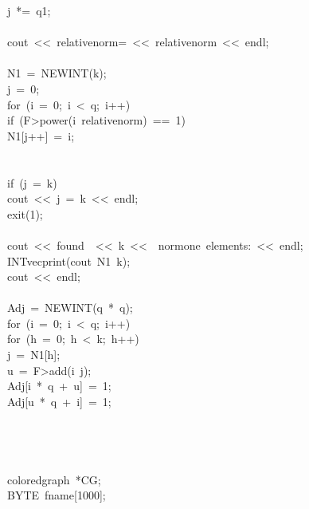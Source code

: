 \begin{tabbing}
\>\>j\ *=\ q1;\\[0pt]
\>\>\\[0pt]
\>cout\ <<\ relativenorm=\ <<\ relativenorm\ <<\ endl;\\[0pt]
\\[0pt]
\>N1\ =\ NEWINT(k);\\[0pt]
\>j\ =\ 0;\\[0pt]
\>for\ (i\ =\ 0;\ i\ <\ q;\ i++)\ \\[0pt]
\>\>if\ (F>power(i\ relativenorm)\ ==\ 1)\ \\[0pt]
\>\>\>N1[j++]\ =\ i;\\[0pt]
\>\>\>\\[0pt]
\>\>\\[0pt]
\>if\ (j\ =\ k)\ \\[0pt]
\>\>cout\ <<\ j\ =\ k\ <<\ endl;\\[0pt]
\>\>exit(1);\\[0pt]
\>\>\\[0pt]
\>cout\ <<\ found\ \ <<\ k\ <<\ \ normone\ elements:\ <<\ endl;\\[0pt]
\>INTvecprint(cout\ N1\ k);\\[0pt]
\>cout\ <<\ endl;\\[0pt]
\\[0pt]
\>Adj\ =\ NEWINT(q\ *\ q);\\[0pt]
\>for\ (i\ =\ 0;\ i\ <\ q;\ i++)\ \\[0pt]
\>\>for\ (h\ =\ 0;\ h\ <\ k;\ h++)\ \\[0pt]
\>\>\>j\ =\ N1[h];\\[0pt]
\>\>\>u\ =\ F>add(i\ j);\\[0pt]
\>\>\>Adj[i\ *\ q\ +\ u]\ =\ 1;\\[0pt]
\>\>\>Adj[u\ *\ q\ +\ i]\ =\ 1;\\[0pt]
\>\>\>\\[0pt]
\>\>\\[0pt]
\\[0pt]
\\[0pt]
\>coloredgraph\ *CG;\\[0pt]
\>BYTE\ fname[1000];\\[0pt]
\\[0pt]

\end{tabbing}
